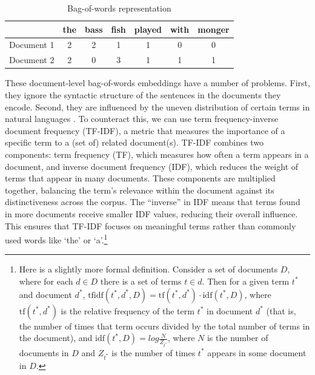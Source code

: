 \begin{table}[h]
    \centering
    \begin{tabular}{|l|c|c|c|c|c|c|}
    \hline
     & the & bass & fish & played & with & monger \\
    \hline
    Document 1 & 2 & 2 & 1 & 1 & 0 & 0 \\
    \hline
    Document 2 & 2 & 0 & 3 & 1 & 1 & 1 \\
    \hline
    \end{tabular}
    \caption{Bag-of-words representation}
    \label{exampleBags}
\end{table}

These document-level bag-of-words embeddings have a number of problems. First, they ignore the syntactic structure of the sentences in the documents they encode. Second, they are influenced by the uneven distribution of certain terms in natural languages \cite{piantadosi2014zipf, zipf1945meaning}. To counteract this, we can use term frequency-inverse document frequency (TF-IDF), a metric that measures the importance of a specific term to a (set of) related document(s). TF-IDF combines two components: term frequency (TF), which measures how often a term appears in a document, and inverse document frequency (IDF), which reduces the weight of terms that appear in many documents. These components are multiplied together, balancing the term's relevance within the document against its distinctiveness across the corpus. The ``inverse'' in IDF means that terms found in more documents receive smaller IDF values, reducing their overall influence. This ensures that TF-IDF focuses on meaningful terms rather than commonly used words like `the' or `a'.\footnote{Here is a slightly more formal definition. Consider a set of documents $D$, where for each $d \in D$ there is a set of terms $t \in d$. Then for a given term $t^*$ and document $d^*$, $\mbox{tfidf}(t^*,d^*, D) = \mbox{tf}(t^*,d^*) \cdot \mbox{idf}(t^*, D)$, where $\mbox{tf}(t^*,d^*)$ is the relative frequency of the term $t^*$ in document $d^*$ (that is, the number of times that term occurs divided by the total number of terms in the document), and $\mbox{idf}(t^*, D) = log \frac{N}{Z_{t^*}}$, where $N$ is the number of documents in $D$ and $Z_{t^*}$ is the number of times $t^*$ appears in some document in $D$.}

